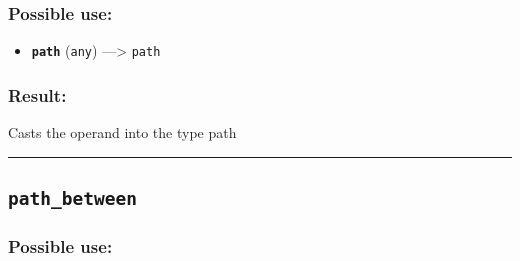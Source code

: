 \documentclass[]{book}
\providecommand{\tightlist}{%
  \setlength{\itemsep}{0pt}\setlength{\parskip}{0pt}}
\theoremstyle{definition}
\theoremstyle{definition}
\theoremstyle{definition}
\theoremstyle{remark}
\begin{document}
\subsubsection{Possible use:}\label{possible-use-394}

\begin{itemize}
\tightlist
\item
  \textbf{\texttt{path}} (\texttt{any}) ---\textgreater{} \texttt{path}
\end{itemize}

\subsubsection{Result:}\label{result-380}

Casts the operand into the type path

\begin{center}\rule{0.5\linewidth}{\linethickness}\end{center}

\subsection{\texorpdfstring{\texttt{path\_between}}{path\_between}}\label{path_between}

\subsubsection{Possible use:}\label{possible-use-395}
\end{document}
